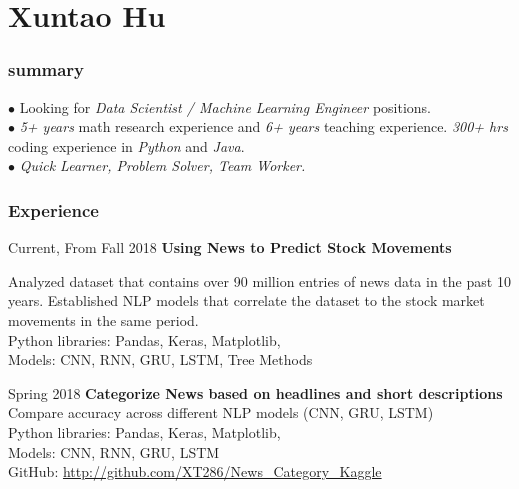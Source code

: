 \documentclass{tccv}
\begin{document}
\part{Xuntao Hu}

\section{summary}
$\bullet$ Looking for {\em Data Scientist / Machine Learning Engineer} positions. \\
$\bullet$ {\em 5+ years} math research experience and {\em 6+ years} teaching experience. {\em 300+ hrs} coding experience in {\em Python} and {\em Java}. \\
$\bullet$ {\em Quick Learner, Problem Solver, Team Worker.} 


\section{Experience}

\begin{eventlist}

\item{Current, From Fall 2018}
     {\textbf{Using News to Predict Stock Movements}}

\small{
Analyzed dataset that contains over 90 million entries of news data in the past 10 years. Established NLP models that correlate the dataset to the stock market movements in the same period. \\
Python libraries: Pandas, Keras, Matplotlib, \\
Models: CNN, RNN, GRU, LSTM, Tree Methods}

\item{Spring 2018}
     {\textbf{Categorize News based on headlines and short descriptions}}
\small{Compare accuracy across different NLP models (CNN, GRU, LSTM)\\
Python libraries: Pandas, Keras, Matplotlib, \\
Models: CNN, RNN, GRU, LSTM\\
GitHub: \url{http://github.com/XT286/News_Category_Kaggle}}

\end{eventlist}


\end{document}
